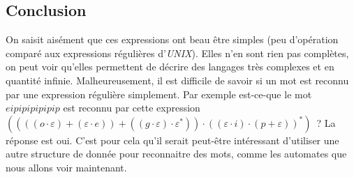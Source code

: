 \vphantom{}

\subsection{Conclusion}

On saisit aisément que ces expressions ont beau être simples (peu d'opération
comparé aux expressions régulières d'\textit{UNIX}). Elles n'en sont rien pas
complètes, on peut voir qu'elles permettent de décrire des langages très
complexes et en quantité infinie. Malheureusement, il est difficile de savoir
si un mot est reconnu par une expression régulière simplement. Par exemple
est-ce-que le mot \(eipipipipipip\) est reconnu par cette expression \(((((o
\cdot \varepsilon)+(\varepsilon \cdot e))+((g\cdot \varepsilon) \cdot
\varepsilon^*)) \cdot ((\varepsilon \cdot i)\cdot (p+\varepsilon))^*)\)~? La
réponse est oui. C'est pour cela qu'il serait peut-être intéressant d'utiliser
une autre structure de donnée pour reconnaitre des mots, comme les automates
que nous allons voir maintenant.